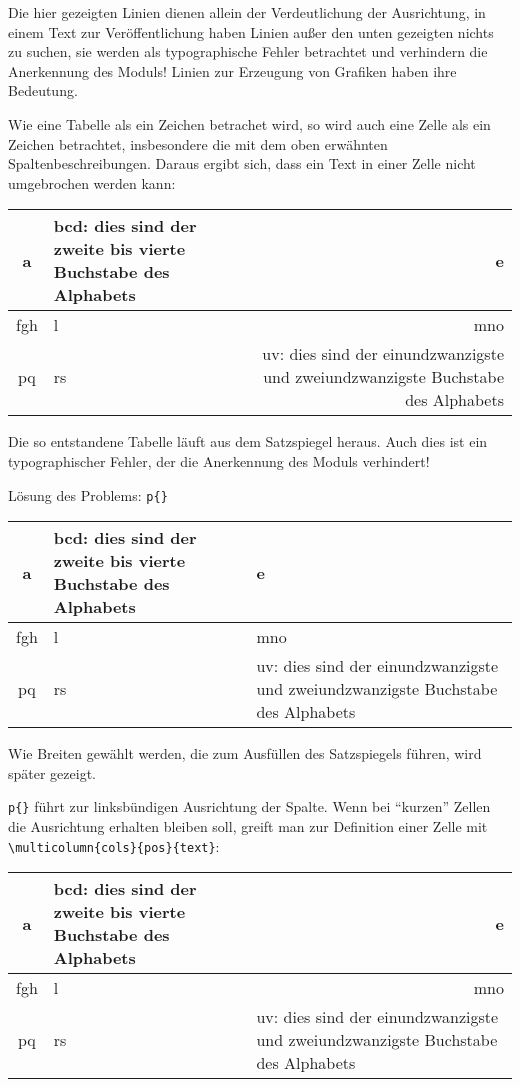 Die hier gezeigten Linien dienen allein der Verdeutlichung der Ausrichtung,
in einem Text zur Veröffentlichung haben Linien außer den unten gezeigten
nichts zu suchen, sie werden als typographische Fehler betrachtet und
verhindern die Anerkennung des Moduls! Linien zur Erzeugung von Grafiken
haben ihre Bedeutung.

Wie eine Tabelle als ein Zeichen betrachet wird, so wird auch eine Zelle
als ein Zeichen betrachtet, insbesondere die mit dem oben erwähnten
Spaltenbeschreibungen. Daraus ergibt sich, dass ein Text in einer Zelle
nicht umgebrochen werden kann:

\begin{tabular}{|c|l|r|}
  \hline
  a & bcd: dies sind der zweite bis vierte Buchstabe des Alphabets & e \\
  \hline
  fgh & l & mno \\
  \hline
  pq & rs & uv: dies sind der einundzwanzigste und zweiundzwanzigste
            Buchstabe des Alphabets \\
  \hline
\end{tabular}%

Die so entstandene Tabelle läuft aus dem Satzspiegel heraus. Auch dies ist
ein typographischer Fehler, der die Anerkennung des Moduls verhindert!

Lösung des Problems: \texttt{p\{\}}

\begin{tabular}{|c|p{4cm}|p{5cm}|}
  \hline
  a & bcd: dies sind der zweite bis vierte Buchstabe des Alphabets & e \\
  \hline
  fgh & l & mno \\
  \hline
  pq & rs & uv: dies sind der einundzwanzigste und zweiundzwanzigste
            Buchstabe des Alphabets \\
  \hline
\end{tabular}%

Wie Breiten gewählt werden, die zum Ausfüllen des Satzspiegels führen, wird
später gezeigt.

\texttt{p\{\}} führt zur linksbündigen Ausrichtung der Spalte.
Wenn bei "`kurzen"' Zellen die Ausrichtung erhalten bleiben soll, greift
man zur Definition einer Zelle mit
\lstinline|\multicolumn{cols}{pos}{text}|:

\begin{tabular}{|c|p{4cm}|p{5cm}|}
  \hline
  a & bcd: dies sind der zweite bis vierte Buchstabe des Alphabets &
                                                                     \multicolumn{1}{r|}{e} \\
  \hline
  fgh & l & \multicolumn{1}{r|}{mno} \\
  \hline
  pq & rs & uv: dies sind der einundzwanzigste und zweiundzwanzigste
            Buchstabe des Alphabets \\
  \hline
\end{tabular}%

